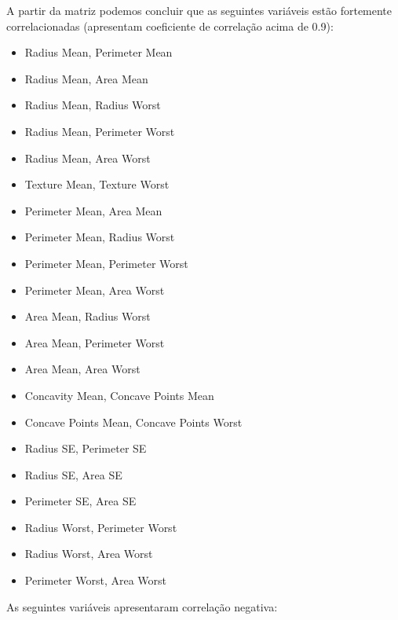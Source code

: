 \documentclass[11pt,a4paper]{article}
\numberwithin{equation}{section}
\begin{document}
A partir da matriz podemos concluir que as seguintes variáveis estão fortemente correlacionadas (apresentam coeficiente de correlação acima de 0.9):

\begin{multicols}{2}
\begin{itemize}
	 \item Radius Mean, Perimeter Mean
	 \item Radius Mean, Area Mean
	 \item Radius Mean, Radius Worst
	 \item Radius Mean, Perimeter Worst
	 \item Radius Mean, Area Worst
	 \item Texture Mean, Texture Worst
	 \item Perimeter Mean, Area Mean
	 \item Perimeter Mean, Radius Worst
	 \item Perimeter Mean, Perimeter Worst
	 \item Perimeter Mean, Area Worst
	 \item Area Mean, Radius Worst
	 \item Area Mean, Perimeter Worst
	 \item Area Mean, Area Worst
	 \item Concavity Mean, Concave Points Mean
	 \item Concave Points Mean, Concave Points Worst
	 \item Radius SE, Perimeter SE
	 \item Radius SE, Area SE
	 \item Perimeter SE, Area SE
 	 \item Radius Worst, Perimeter Worst
	 \item Radius Worst, Area Worst
	 \item Perimeter Worst, Area Worst
\end{itemize}
\end{multicols}
As seguintes variáveis apresentaram correlação negativa:
\end{document}
